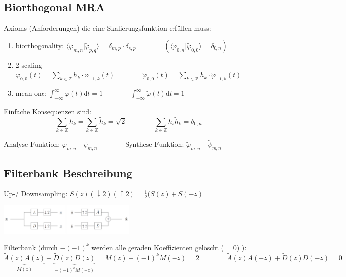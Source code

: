 \subsection{Biorthogonal MRA}

Axioms (Anforderungen) die eine Skalierungsfunktion erfüllen muss:
\begin{enumerate}
	\item biorthogonality: $ \langle \varphi_{m,n}|\tilde{\varphi}_{p,q} \rangle = \delta_{m,p}\cdot \delta_{n,p} \qquad \qquad \left( \langle \varphi_{0,n}|\tilde{\varphi}_{0,0} \rangle = \delta_{0,n} \right)$
	\item 2-scaling: $ \varphi_{0,0}(t) = \sum_{k \in \mathbb{Z}} h_k \cdot \varphi_{-1,k}(t) \qquad \qquad  \tilde{\varphi}_{0,0}(t) = \sum_{k \in \mathbb{Z}} h_k \cdot \tilde{\varphi}_{-1,k}(t) $
	\item mean one: $ \int_{-\infty}^{\infty}\varphi(t) \mathrm{d}t = 1 \qquad \qquad \int_{-\infty}^{\infty}\tilde{\varphi}(t) \mathrm{d}t = 1$
\end{enumerate}

Einfache Konsequenzen sind:
\[ 
	\sum_{k \in  \mathbb{Z}} h_k = \sum_{k \in  \mathbb{Z}} \tilde{h}_k = \sqrt{2} 
	\qquad \qquad
	\sum_{k \in  \mathbb{Z}} h_k \tilde{h}_k = \delta_{0,n}
\]

$  
	\text{Analyse-Funktion: } \varphi_{m,n} \quad \psi_{m,n}
	\qquad \qquad
	\text{Synthese-Funktion: } \tilde{\varphi}_{m,n} \quad \tilde{\psi}_{m,n}
$


\subsection{Filterbank Beschreibung}
Up-/ Downsampling: $ S(z) (\downarrow 2)(\uparrow 2) = \frac{1}{2} (S(z)+S(-z) $

\vspace{-2cm}

\begin{flushright}
	\includegraphics[width=0.5\textwidth]{content/FilterBank.pdf} 
\end{flushright}
 
\vspace{-0.5cm}

Filterbank (durch $-(-1)^k$ werden alle geraden Koeffizienten gelöscht ($=0$) ):
\[  
	\underbrace{\tilde{A}(z) A(z)}_{M(z)} + \underbrace{\tilde{D}(z)D(z)}_{-(-1)^k M(-z)} = M(z)-(-1)^kM(-z) = 2
	\qquad \qquad
	\tilde{A}(z)A(-z) + \tilde{D}(z)D(-z) = 0
\]

